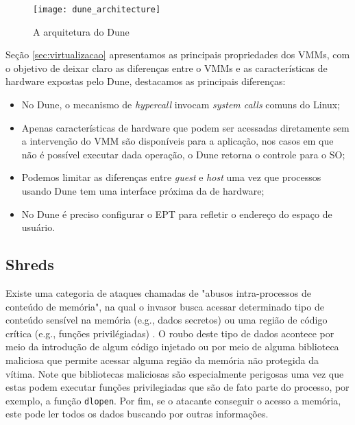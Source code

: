 \begin{figure}[!h]
  \centering
  \texttt{[image: dune\_architecture]} 
  \caption{A arquitetura do Dune~\citep{belay}}
  \label{fig:dune_architecture}
\end{figure}

Seção \ref{sec:virtualizacao} apresentamos as principais propriedades dos VMMs,
com o objetivo de deixar claro as diferenças entre o VMMs e as características
de hardware expostas pelo Dune, destacamos as principais diferenças:

\begin{itemize}
  \item No Dune, o mecanismo de \textit{hypercall} invocam
        \textit{system calls} comuns do Linux;
  \item Apenas características de hardware que podem ser acessadas diretamente
        sem a intervenção do VMM são disponíveis para a aplicação, nos casos em
        que não é possível executar dada operação, o Dune retorna o controle
        para o SO;
  \item Podemos limitar as diferenças entre \textit{guest} e \textit{host} uma
        vez que processos usando Dune tem uma interface próxima da de hardware;
  \item No Dune é preciso configurar o EPT para refletir o endereço do espaço
        de usuário.
\end{itemize}

\subsection{Shreds}

Existe uma categoria de ataques chamadas de "abusos intra-processos de conteúdo
de memória", na qual o invasor busca acessar determinado tipo de conteúdo
sensível na memória (e.g., dados secretos) ou uma região de código crítica
(e.g., funções privilégiadas) \citep{shreds}. O roubo deste tipo de dados
acontece por meio da introdução de algum código injetado ou por meio de alguma
biblioteca maliciosa que permite acessar alguma região da memória não protegida
da vítima. Note que bibliotecas maliciosas são especialmente perigosas uma vez
que estas podem executar funções privilegiadas que são de fato parte do
processo, por exemplo, a função \texttt{dlopen}. Por fim, se o atacante
conseguir o acesso a memória, este pode ler todos os dados buscando por outras
informações.

